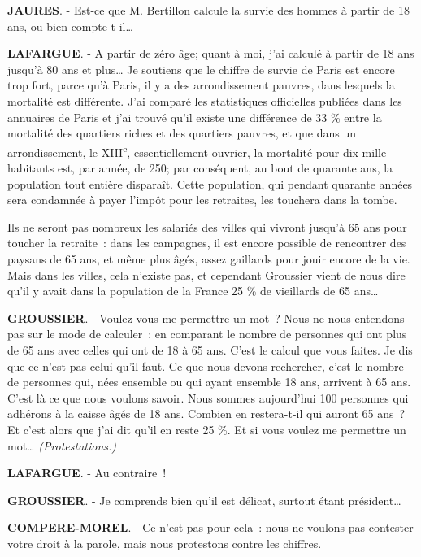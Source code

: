 \documentclass[french,twoside]{book} %
\begin{document}
\textbf{JAURES}. - Est-ce que M. Bertillon calcule la survie des hommes à partir de 18 ans, ou bien compte-t-il…\par
\textbf{LAFARGUE}. - A partir de zéro âge; quant à moi, j’ai calculé à partir de 18 ans jusqu’à 80 ans et plus… Je soutiens que le chiffre de survie de Paris est encore trop fort, parce qu’à Paris, il y a des arrondissement pauvres, dans lesquels la mortalité est différente. J'ai comparé les statistiques officielles publiées dans les annuaires de Paris et j’ai trouvé qu’il existe une différence de 33 \% entre la mortalité des quartiers riches et des quartiers pauvres, et que dans un arrondissement, le XIII\textsuperscript{e}, essentiellement ouvrier, la mortalité pour dix mille habitants est, par année, de 250; par conséquent, au bout de quarante ans, la population tout entière disparaît. Cette population, qui pendant quarante années sera condamnée à payer l’impôt pour les retraites, les touchera dans la tombe.\par
Ils ne seront pas nombreux les salariés des villes qui vivront jusqu’à 65 ans pour toucher la retraite : dans les campagnes, il est encore possible de rencontrer des paysans de 65 ans, et même plus âgés, assez gaillards pour jouir encore de la vie. Mais dans les villes, cela n’existe pas, et cependant Groussier vient de nous dire qu’il y avait dans la population de la France 25 \% de vieillards de 65 ans…\par
\textbf{GROUSSIER}. - Voulez-vous me permettre un mot ? Nous ne nous entendons pas sur le mode de calculer : en comparant le nombre de personnes qui ont plus de 65 ans avec celles qui ont de 18 à 65 ans. C'est le calcul que vous faites. Je dis que ce n’est pas celui qu’il faut. Ce que nous devons rechercher, c’est le nombre de personnes qui, nées ensemble ou qui ayant ensemble 18 ans, arrivent à 65 ans. C'est là ce que nous voulons savoir. Nous sommes aujourd’hui 100 personnes qui adhérons à la caisse âgés de 18 ans. Combien en restera-t-il qui auront 65 ans ? Et c’est alors que j’ai dit qu’il en reste 25 \%. Et si vous voulez me permettre un mot… \emph{(Protestations.)}\par
\textbf{LAFARGUE}. - Au contraire !\par
\textbf{GROUSSIER}. - Je comprends bien qu’il est délicat, surtout étant président…\par
\textbf{COMPERE-MOREL}. - Ce n’est pas pour cela : nous ne voulons pas contester votre droit à la parole, mais nous protestons contre les chiffres.\par
\end{document}
